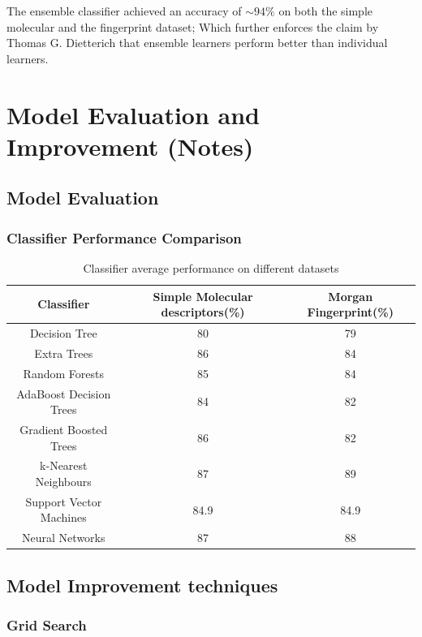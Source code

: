 \documentclass[a4paper,12pt]{report}
\begin{document}
		The ensemble classifier achieved an accuracy of $\sim94\%$ on both the simple molecular and the fingerprint dataset; Which further enforces the claim by Thomas G. Dietterich \cite{Dietterich} that ensemble learners perform better than individual learners.
		
		

\chapter{Model Evaluation and Improvement (Notes)}
	\section{Model Evaluation}
				
		\subsection{Classifier Performance Comparison}
		\begin{table}[ht]
			\caption{Classifier average performance on different datasets}
			\centering
			\begin{tabular}{c|c|c}	
				\hline\hline
				Classifier & Simple Molecular descriptors(\%) & Morgan Fingerprint(\%) \\
				\hline
				Decision Tree & 80 & 79 \\
				Extra Trees & 86 & 84 \\
				Random Forests & 85 & 84 \\
				AdaBoost Decision Trees & 84 & 82 \\
				Gradient Boosted Trees & 86 & 82 \\
				k-Nearest Neighbours & 87 & 89 \\ 
				Support Vector Machines & 84.9 & 84.9 \\
				Neural Networks & 87 & 88 \\
				\hline
			\end{tabular}
		\end{table}
	\section{Model Improvement techniques}
		\subsection{Grid Search}
\end{document}
